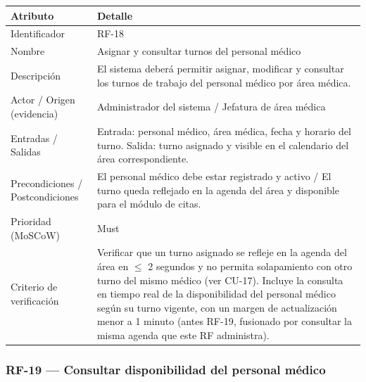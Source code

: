 \documentclass[11pt,a4paper]{article}
\begin{document}
	\begin{longtable}{p{} p{}}
		
		\toprule
		\textbf{Atributo} & \textbf{Detalle} \\
		\midrule
		\endhead
		
		Identificador & RF-18 \\
		Nombre & Asignar y consultar turnos del personal médico \\
		Descripción & El sistema deberá permitir asignar, modificar y consultar los turnos de trabajo del personal médico por área médica. \\
		Actor / Origen (evidencia) & Administrador del sistema / Jefatura de área médica \\
		Entradas / Salidas & Entrada: personal médico, área médica, fecha y horario del turno. Salida: turno asignado y visible en el calendario del área correspondiente. \\
		Precondiciones / Postcondiciones & El personal médico debe estar registrado y activo / El turno queda reflejado en la agenda del área y disponible para el módulo de citas. \\
		Prioridad (MoSCoW) & Must \\
		Criterio de verificación & Verificar que un turno asignado se refleje en la agenda del área en \(\leq\) 2 segundos y no permita solapamiento con otro turno del mismo médico (ver CU-17). Incluye la consulta en tiempo real de la disponibilidad del personal médico según su turno vigente, con un margen de actualización menor a 1 minuto (antes RF-19, fusionado por consultar la misma agenda que este RF administra). \\
		\bottomrule
	\end{longtable}
	
	\subsubsection{RF-19 --- Consultar disponibilidad del personal médico}
	
\end{document}

